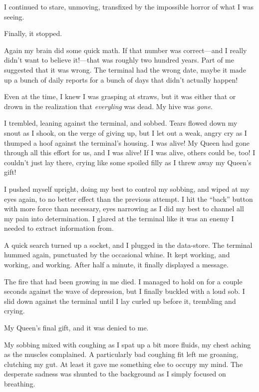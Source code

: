 I continued to stare, unmoving, transfixed by the impossible horror of what I was seeing.

Finally, it stopped.


Again my brain did some quick math. If that number was correct—and I really didn’t want to believe it!—that was roughly two hundred years. Part of me suggested that it was wrong. The terminal had the wrong date, maybe it made up a bunch of daily reports for a bunch of days that didn’t actually happen!

Even at the time, I knew I was grasping at straws, but it was either that or drown in the realization that \textit{everyling} was dead. My hive was \textit{gone}.

I trembled, leaning against the terminal, and sobbed. Tears flowed down my snout as I shook, on the verge of giving up, but I let out a weak, angry cry as I thumped a hoof against the terminal’s housing. I was alive! My Queen had gone through all this effort for us, and I was alive! If I was alive, others could be, too! I couldn’t just lay there, crying like some spoiled filly as I threw away my Queen’s gift!

I pushed myself upright, doing my best to control my sobbing, and wiped at my eyes again, to no better effect than the previous attempt. I hit the “back” button with more force than necessary, eyes narrowing as I did my best to channel all my pain into determination. I glared at the terminal like it was an enemy I needed to extract information from.

A quick search turned up a socket, and I plugged in the data-store. The terminal hummed again, punctuated by the occasional whine. It kept working, and working, and working. After half a minute, it finally displayed a message.


The fire that had been growing in me died. I managed to hold on for a couple seconds against the wave of depression, but I finally buckled with a loud sob. I slid down against the terminal until I lay curled up before it, trembling and crying.

My Queen’s final gift, and it was denied to me.

My sobbing mixed with coughing as I spat up a bit more fluids, my chest aching as the muscles complained. A particularly bad coughing fit left me groaning, clutching my gut. At least it gave me something else to occupy my mind. The desperate sadness was shunted to the background as I simply focused on breathing.

